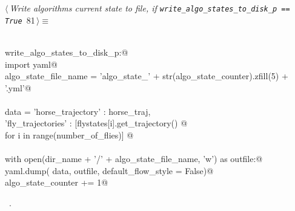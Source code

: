 \documentclass[11.5pt]{report}
\begin{document}
\vspace{-0.8cm} \newchunk \blindtext
\begin{flushleft} \small
\begin{minipage}{\linewidth}\label{scrap128}\raggedright\small
{} $\langle\,${\itshape Write algorithms current state to file, if \verb|write_algo_states_to_disk_p == True|}\nobreak\ {\footnotesize {81}}$\,\rangle\equiv$
\vspace{-1ex}
\begin{list}{}{} \item
\mbox{}\verb@@\\
\mbox{}\verb@if write_algo_states_to_disk_p:@\\
\mbox{}\verb@     import yaml@\\
\mbox{}\verb@     algo_state_file_name = 'algo_state_' + str(algo_state_counter).zfill(5) + '.yml'@\\
\mbox{}\verb@@\\
\mbox{}\verb@     data = {'horse_trajectory' : horse_traj, \@\\
\mbox{}\verb@             'fly_trajectories' : [flystates[i].get_trajectory() @\\
\mbox{}\verb@                                   for i in range(number_of_flies)] }@\\
\mbox{}\verb@@\\
\mbox{}\verb@     with open(dir_name + '/' + algo_state_file_name, 'w') as outfile:@\\
\mbox{}\verb@          yaml.dump( data, outfile, default_flow_style = False)@\\
\mbox{}\verb@     algo_state_counter += 1@\\
\mbox{}\verb@@{\NWsep}
\end{list}
\vspace{-1.5ex}
\footnotesize
\begin{list}{}{\setlength{\itemsep}{-\parsep}\setlength{\itemindent}{-\leftmargin}}
\item \NWtxtMacroRefIn\ .

\item{}
\end{list}
\end{minipage}\vspace{4ex}
\end{flushleft}
\end{document}
